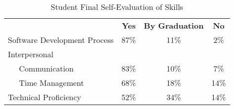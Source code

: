 \begin{table}[]
\caption{Student Final Self-Evaluation of Skills}
\label{tab:students}
\begin{tabular}{llccc}
 &  & \textbf{Yes} & \textbf{By Graduation} & \textbf{No} \\
\multicolumn{2}{l}{Software Development Process} & 87\% & 11\% & 2\% \\
\multicolumn{5}{l}{Interpersonal} \\
 & Communication & 83\% & 10\% & 7\% \\
 & Time Management & 68\% & 18\% & 14\% \\
\multicolumn{2}{l}{Technical Proficiency} & 52\% & 34\% & 14\%
\end{tabular}
\end{table}
